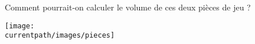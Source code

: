 \begin{exercice}
   Comment pourrait-on calculer le volume de ces deux pièces de jeu ?
   \begin{center}
      \texttt{[image: \\currentpath/images/pieces]}
   \end{center}
\end{exercice}
